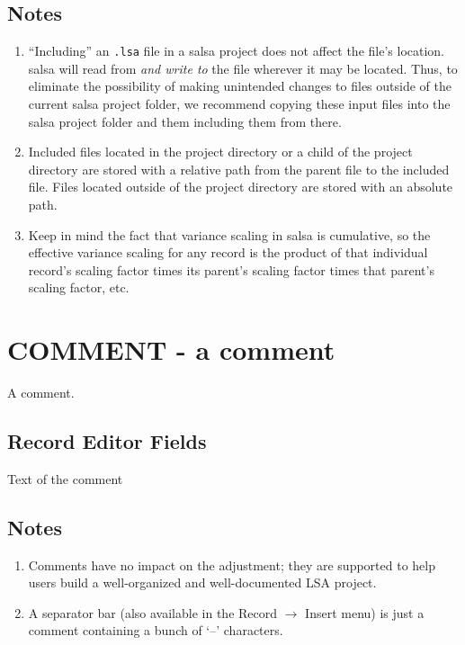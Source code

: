 \subsection*{Notes}
\begin{enumerate}
\item ``Including'' an \verb+.lsa+ file in a \textsf{salsa} project does not affect the file's location.  \textsf{salsa} will read from \emph{and write to} the file wherever it may be located.  Thus, to eliminate the possibility of making unintended changes to files outside of the current \textsf{salsa} project folder, we recommend copying these input files into the \textsf{salsa} project folder and them including them from there.
\item Included files located in the project directory or a child of the project directory are stored with a relative path from the parent file to the included file.  Files located outside of the project directory are stored with an absolute path.
\item Keep in mind the fact that variance scaling in \textsf{salsa} is cumulative, so the effective variance scaling for any record is the product of that individual record's scaling factor times its parent's scaling factor times that parent's scaling factor, etc. 
\end{enumerate}


\hrulefill
\section{COMMENT - a comment}

A comment.

\subsection*{Record Editor Fields}

\begin{description}[leftmargin=!,labelwidth=\widthof{\bfseries Comment:}]
\item[Comment:] Text of the comment
\end{description}

\subsection*{Notes}
\begin{enumerate}
\item Comments have no impact on the adjustment; they are supported to help users build a well-organized and well-documented LSA project.
\item A separator bar (also available in the Record $\to$ Insert menu) is just a comment containing a bunch of `--' characters.
\end{enumerate}


